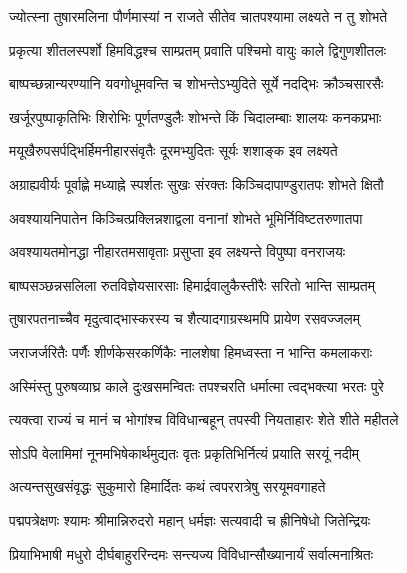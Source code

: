 \twolineshloka
{ज्योत्स्ना तुषारमलिना पौर्णमास्यां न राजते}
{सीतेव चातपश्यामा लक्ष्यते न तु शोभते} %

\twolineshloka
{प्रकृत्या शीतलस्पर्शो हिमविद्धश्च साम्प्रतम्}
{प्रवाति पश्चिमो वायुः काले द्विगुणशीतलः} %

\twolineshloka
{बाष्पच्छन्नान्यरण्यानि यवगोधूमवन्ति च}
{शोभन्तेऽभ्युदिते सूर्ये नदद्भिः क्रौञ्चसारसैः} %

\twolineshloka
{खर्जूरपुष्पाकृतिभिः शिरोभिः पूर्णतण्डुलैः}
{शोभन्ते किं चिदालम्बाः शालयः कनकप्रभाः} %

\twolineshloka
{मयूखैरुपसर्पद्भिर्हिमनीहारसंवृतैः}
{दूरमभ्युदितः सूर्यः शशाङ्क इव लक्ष्यते} %

\twolineshloka
{अग्राह्यवीर्यः पूर्वाह्णे मध्याह्ने स्पर्शतः सुखः}
{संरक्तः किञ्चिदापाण्डुरातपः शोभते क्षितौ} %

\twolineshloka
{अवश्यायनिपातेन किञ्चित्प्रक्लिन्नशाद्वला}
{वनानां शोभते भूमिर्निविष्टतरुणातपा} %

\twolineshloka
{अवश्यायतमोनद्धा नीहारतमसावृताः}
{प्रसुप्ता इव लक्ष्यन्ते विपुष्पा वनराजयः} %

\twolineshloka
{बाष्पसञ्छन्नसलिला रुतविज्ञेयसारसाः}
{हिमार्द्रवालुकैस्तीरैः सरितो भान्ति साम्प्रतम्} %

\twolineshloka
{तुषारपतनाच्चैव मृदुत्वाद्भास्करस्य च}
{शैत्यादगाग्रस्थमपि प्रायेण रसवज्जलम्} %

\twolineshloka
{जराजर्जरितैः पर्णैः शीर्णकेसरकर्णिकैः}
{नालशेषा हिमध्वस्ता न भान्ति कमलाकराः} %

\twolineshloka
{अस्मिंस्तु पुरुषव्याघ्र काले दुःखसमन्वितः}
{तपश्चरति धर्मात्मा त्वद्भक्त्या भरतः पुरे} %

\twolineshloka
{त्यक्त्वा राज्यं च मानं च भोगांश्च विविधान्बहून्}
{तपस्वी नियताहारः शेते शीते महीतले} %

\twolineshloka
{सोऽपि वेलामिमां नूनमभिषेकार्थमुद्यतः}
{वृतः प्रकृतिभिर्नित्यं प्रयाति सरयूं नदीम्} %

\twolineshloka
{अत्यन्तसुखसंवृद्धः सुकुमारो हिमार्दितः}
{कथं त्वपररात्रेषु सरयूमवगाहते} %

\twolineshloka
{पद्मपत्रेक्षणः श्यामः श्रीमान्निरुदरो महान्}
{धर्मज्ञः सत्यवादी च ह्रीनिषेधो जितेन्द्रियः} %

\twolineshloka
{प्रियाभिभाषी मधुरो दीर्घबाहुररिन्दमः}
{सन्त्यज्य विविधान्सौख्यानार्यं सर्वात्मनाश्रितः} %

